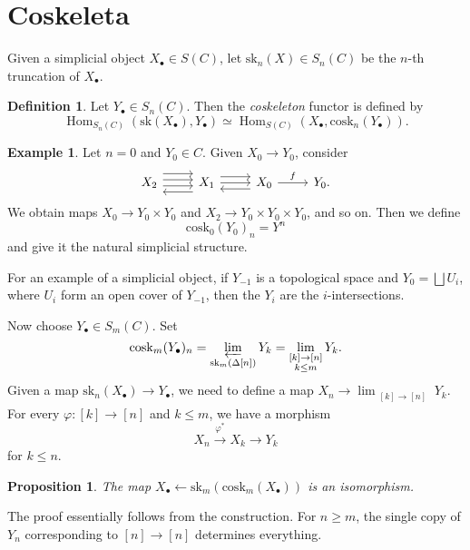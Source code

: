 \documentclass[leqno, openany]{memoir}
\newtheorem{prop}[thm]{Proposition}
\theoremstyle{definition}
\newtheorem{defn}[thm]{Definition}
\newtheorem{exm}[thm]{Example}
\theoremstyle{remark}
\theoremstyle{plain}
\theoremstyle{definition}
\theoremstyle{remark}
\newcommand{\mr}[1]{\mathrm{#1}}
\DeclareMathOperator{\Hom}{Hom}
\begin{document}
\section{Coskeleta}%
\label{sec:coskeleta}

Given a simplicial object $X_{\bullet} \in S(C)$, let $\mr{sk}_n(X) \in S_n(C)$ be the $n$-th truncation of $X_{\bullet}$.

\begin{defn}
    Let $Y_{\bullet} \in S_n(C)$. Then the \textit{coskeleton} functor is defined by
    \[ \Hom_{S_n(C)}(\mr{sk}(X_{\bullet}), Y_{\bullet}) \simeq \Hom_{S(C)}(X_{\bullet}, \mr{cosk}_n(Y_{\bullet})). \]
\end{defn}

\begin{exm}
    Let $n = 0$ and $Y_0 \in C$. Given $X_0 \to Y_0$, consider
    \begin{equation*}
    \begin{tikzcd}
        X_2 \ar[shift left=3]{r} 
        \ar[shift right=1]{r}
        \ar[shift left=1]{r}
        & X_1 \ar{r} \ar[shift left=3]{l} 
        \ar[shift left=2]{r}
        & X_0 \ar{r}{f} 
        \ar[shift left=2]{l}
        & Y_0.
    \end{tikzcd}
    \end{equation*}
    We obtain maps $X_0 \to Y_0 \times Y_0$ and $X_2 \to Y_0 \times Y_0 \times Y_0$, and so on. Then we define
    \[ \mr{cosk}_0(Y_0)_n = Y^n \]
    and give it the natural simplicial structure.
\end{exm}

For an example of a simplicial object, if $Y_{-1}$ is a topological space and $Y_0 = \bigsqcup U_i$, where $U_i$ form an open cover of $Y_{-1}$, then the $Y_i$ are the $i$-intersections.

Now choose $Y_{\bullet} \in S_m(C)$. Set 
\[ \mr{cosk}_m(Y_{\bullet})_n = \varprojlim_{\mr{sk}_m(\Delta[n])} Y_k = \lim_{\substack{[k] \to [n] \\ k \leq m}} Y_k. \]
Given a map $\mr{sk}_n(X_{\bullet}) \to Y_{\bullet}$, we need to define a map $X_n \to \lim_{\substack{[k] \to [n]}} Y_k$. For every $\varphi \colon [k] \to [n]$ and $k \leq m$, we have a morphism
\[ X_n \xrightarrow{\varphi^*} X_k \to Y_k \]
for $k \leq n$.

\begin{prop}
    The map $X_{\bullet} \gets \mr{sk}_m(\mr{cosk}_m(X_{\bullet}))$ is an isomorphism.
\end{prop}
The proof essentially follows from the construction. For $n \geq m$, the single copy of $Y_n$ corresponding to $[n] \to [n]$ determines everything.
\end{document}
